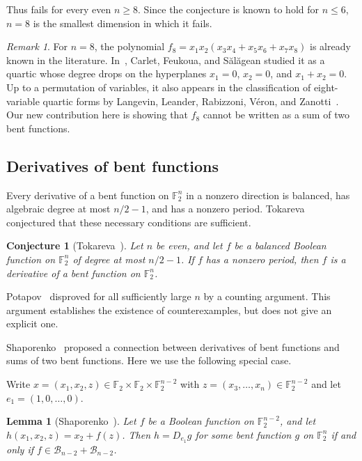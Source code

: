 \documentclass{amsart}
\numberwithin{equation}{section}
\theoremstyle{plain}
\newtheorem{lemma}[equation]{Lemma}
\newtheorem{conjecture}[equation]{Conjecture}
\theoremstyle{definition}
\theoremstyle{remark}
\newtheorem{remark}[equation]{Remark}
\newcommand{\F}{\mathbb{F}_2}
\newcommand{\B}{\mathcal{B}}
\begin{document}
Thus  fails for every even $n\ge 8$. Since the conjecture is known to hold for $n\le 6$, $n=8$ is the smallest dimension in which it fails.

\begin{remark}
For $n=8$, the polynomial $f_8=x_1x_2(x_3x_4+x_5x_6+x_7x_8)$ is already known in the literature. In~\cite{carlet2025}, Carlet, Feukoua, and S\u{a}l\u{a}gean studied it as a quartic whose degree drops on the hyperplanes $x_1=0$, $x_2=0$, and $x_1+x_2=0$. Up to a permutation of variables, it also appears in the classification of eight-variable quartic forms by Langevin, Leander, Rabizzoni, V\'eron, and Zanotti~\cite{langevincatalogue}. Our new contribution here is showing that $f_8$ cannot be written as a sum of two bent functions.
\end{remark}


\subsection{Derivatives of bent functions}
\label{subsec:derivatives}

Every derivative of a bent function on $\F^n$
in a nonzero direction is balanced, has algebraic degree at most
$n/2-1$, and has a nonzero period. Tokareva~\cite{tokareva2016}
conjectured that these necessary conditions are sufficient.

\begin{conjecture}[Tokareva~\cite{tokareva2016}]
\label{conj:derivative}
Let $n$ be even, and let $f$ be a balanced Boolean function on $\F^n$
of degree at most $n/2-1$. If $f$ has a nonzero period, then $f$ is
a derivative of a bent function on $\F^n$.
\end{conjecture}

Potapov~\cite{potapov2023} disproved  for all
sufficiently large $n$ by a counting argument. This argument establishes
the existence of counterexamples, but does not give an explicit one.

Shaporenko~\cite{shaporenko2023} proposed a connection between
derivatives of bent functions and sums of two bent functions. Here we use the following special case.

Write $x=(x_1,x_2,z)\in\F\times\F\times\F^{n-2}$ with $z=(x_3,\ldots,x_n)\in\F^{n-2}$ and let $e_1=(1,0,\ldots,0)$.

\begin{lemma}[Shaporenko~\cite{shaporenko2023}]
\label{lem:shaporenko}
Let $f$ be a Boolean function on $\F^{n-2}$, and let $h(x_1,x_2,z)=x_2+f(z)$. Then $h=D_{e_1}g$ for some bent
function $g$ on $\F^n$ if and only if $f\in\B_{n-2}+\B_{n-2}$.
\end{lemma}
\end{document}

